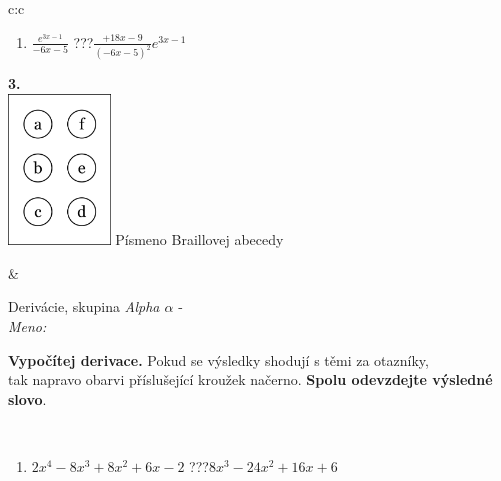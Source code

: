 \documentclass[10pt]{report}
\begin{document}
\begin{tabular}{c:c}
\begin{minipage}[c][104.5mm][t]{0.5\linewidth}
\begin{center}
\begin{minipage}{0.79\linewidth}
\begin{center}
\begin{varwidth}{\linewidth}
\begin{enumerate}
\item $\frac{e^{3x-1}}{-6x-5}$\quad \dotfill\; ???\;\dotfill \quad $\frac{+18x-9}{(-6x-5)^2}e^{3x-1}$
\end{enumerate}
\end{varwidth}
\end{center}
\end{minipage}
\begin{minipage}{0.20\linewidth}
\begin{center}
{\Huge\bfseries 3.} \\[2mm]
\includegraphics[height=40mm]{../images/braille.png}
{\small Písmeno Braillovej abecedy}
\end{center}
\end{minipage}
\end{center}
\end{minipage}
&
\begin{minipage}[c][104.5mm][t]{0.5\linewidth}
\begin{center}
\vspace{7mm}
{\huge Derivácie, skupina \textit{Alpha $\alpha$} -}\\[5mm]
\textit{Meno:}\phantom{xxxxxxxxxxxxxxxxxxxxxxxxxxxxxxxxxxxxxxxxxxxxxxxxxxxxxxxxxxxxxxxxx}\\[5mm]
\begin{minipage}{0.95\linewidth}
\begin{center}
\textbf{Vypočítej derivace.} Pokud se výsledky shodují s těmi za otazníky,\\tak napravo obarvi příslušející kroužek načerno. \textbf{Spolu odevzdejte výsledné slovo}.
\end{center}
\end{minipage}
\\[1mm]
\begin{minipage}{0.79\linewidth}
\begin{center}
\begin{varwidth}{\linewidth}
\begin{enumerate}
\normalsize
\item $2x^4-8x^3+8x^2+6x-2$\quad \dotfill\; ???\;\dotfill \quad $8x^3-24x^2+16x+6$

\end{enumerate}
\end{varwidth}
\end{center}
\end{minipage}
\end{center}
\end{minipage}
\end{tabular}
\end{document}
